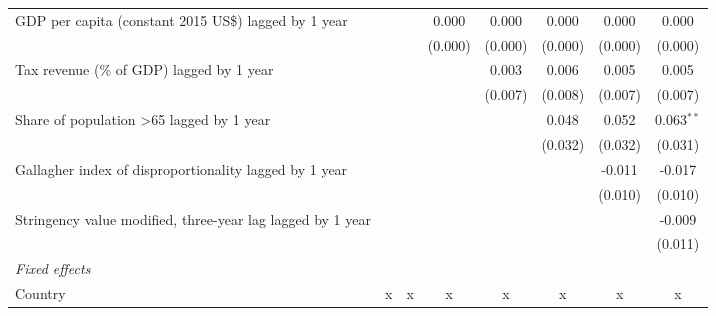\begin{tabular}{lccccccc}
   GDP per capita (constant 2015 US\$) lagged by 1 year                                 &              &              & 0.000        & 0.000         & 0.000        & 0.000        & 0.000\\   
                                                                                        &              &              & (0.000)      & (0.000)       & (0.000)      & (0.000)      & (0.000)\\   
   Tax revenue (\% of GDP) lagged by 1 year                                             &              &              &              & 0.003         & 0.006        & 0.005        & 0.005\\   
                                                                                        &              &              &              & (0.007)       & (0.008)      & (0.007)      & (0.007)\\   
   Share of population >65 lagged by 1 year                                             &              &              &              &               & 0.048        & 0.052        & 0.063$^{**}$\\   
                                                                                        &              &              &              &               & (0.032)      & (0.032)      & (0.031)\\   
   Gallagher index of disproportionality lagged by 1 year                               &              &              &              &               &              & -0.011       & -0.017\\   
                                                                                        &              &              &              &               &              & (0.010)      & (0.010)\\   
   Stringency value modified, three-year lag lagged by 1 year                           &              &              &              &               &              &              & -0.009\\   
                                                                                        &              &              &              &               &              &              & (0.011)\\   
   \emph{Fixed effects}\\
   Country                                                                              & x            & x            & x            & x             & x            & x            & x\\  

\end{tabular}
